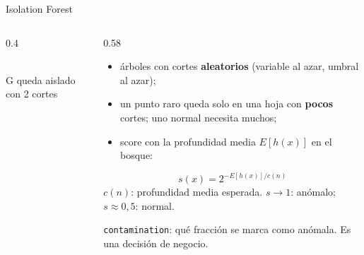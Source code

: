 \documentclass[aspectratio=169,12pt]{beamer}
\newcommand{\miniaxes}{%
  \draw[step=1,mlgray!25,very thin] (0,0) grid (9,8);
  \draw[-{Stealth},mlgray] (0,0) -- (9.3,0); \draw[-{Stealth},mlgray] (0,0) -- (0,8.3);}
\begin{document}
\begin{frame}{Isolation Forest}
  \begin{columns}[c]
    \begin{column}{0.4\textwidth}
      \centering
      \\
      {\scriptsize G queda aislado con 2 cortes}
    \end{column}
    \begin{column}{0.58\textwidth}
      \footnotesize
      \begin{itemize}
        \item árboles con cortes \textbf{aleatorios} (variable al azar, umbral al azar);
        \item un punto raro queda solo en una hoja con \textbf{pocos} cortes; uno normal necesita muchos;
        \item score con la profundidad media $E[h(x)]$ en el bosque:
      \end{itemize}
      \[ s(x) = 2^{-E[h(x)]/c(n)} \]
      {\footnotesize $c(n)$: profundidad media esperada. $s \to 1$: anómalo; $s \approx 0{,}5$: normal.}
      \begin{goldbox}
        \scriptsize \texttt{contamination}: qué fracción se marca como anómala. Es una decisión de negocio.
      \end{goldbox}
    \end{column}
  \end{columns}
\end{frame}
\end{document}
